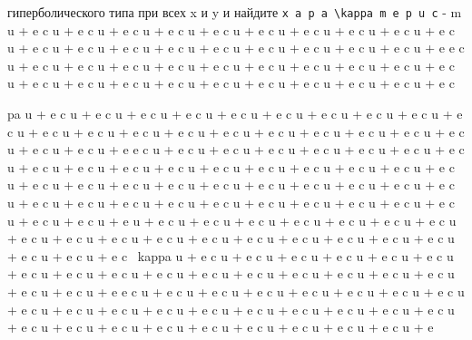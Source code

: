 \documentclass[
  ukrainian,
]{article}
\begin{document}
гиперболического типа при всех x и y и найдите
\texttt{x\ a\ p\ a\ \textbackslash{}kappa\ m\ e\ p\ u\ c} - m u + e c
\kappa u + e c \kappa u + e c \kappa u + e c \kappa u + e c \kappa u + e
c \kappa u + e c \kappa u + e c \kappa u + e c \kappa u + e c \kappa u +
e c \kappa u + e c \kappa u + e c \kappa u + e c \kappa u + e c \kappa u
+ e c \kappa u + e c \kappa u + e c \kappa u + e c \kappa u + e e c
\kappa u + e c \kappa u + e c \kappa u + e c \kappa u + e c \kappa u + e
c \kappa u + e c \kappa u + e c \kappa u + e c \kappa u + e c \kappa u +
e c \kappa u + e c \kappa u + e c \kappa u + e c \kappa u + e c \kappa u
+ e c \kappa u + e c \kappa u + e c \kappa u + e c \kappa u + e c \kap u
+ e c \kap

pa u + e c \kappa u + e c \kappa u + e c \kappa u + e c \kappa u + e c
\kappa u + e c \kappa u + e c \kappa u + e c \kappa u + e c \kappa u + e
c \kappa u + e c \kappa u + e c \kappa u + e c \kappa u + e c \kappa u +
e c \kappa u + e c \kappa u + e c \kappa u + e c \kappa u + e c \kappa u
+ e c \kappa u + e c \kappa u + e c \kappa u + e e c \kappa u + e c
\kappa u + e c \kappa u + e c \kappa u + e c \kappa u + e c \kappa u + e
c \kappa u + e c \kappa u + e c \kappa u + e c \kappa u + e c \kappa u +
e c \kappa u + e c \kappa u + e c \kappa u + e c \kappa u + e c \kappa u
+ e c \kappa u + e c \kappa u + e c \kappa u + e c \kappa u + e c
\kappa u + e c \kappa u + e c \kappa u + e c \kappa u + e c \kappa u + e
c \kappa u + e c \kappa u + e c \kappa u + e c \kappa u + e c \kappa u +
e c \kappa u + e c \kappa u + e c \kappa u + e c \kappa u + e c \kappa u
+ e c \kappa u + e c \kappa u + e c \kappa u + e c \kappa u + e c
\kappa u + e u + e c \kappa u + e c \kappa u + e c \kappa u + e c
\kappa u + e c \kappa u + e c \kappa u + e c \kappa u + e c \kappa u + e
c \kappa u + e c \kappa u + e c \kappa u + e c \kappa u + e c \kappa u +
e c \kappa u + e c \kappa u + e c \kappa u + e c \kappa u + e c \kappa u
+ e c \kappa u + e c ~kappa u + e c \kappa u + e c \kappa u + e c
\kappa u + e c \kappa u + e c \kappa u + e c \kappa u + e c \kappa u + e
c \kappa u + e c \kappa u + e c \kappa u + e c \kappa u + e c \kappa u +
e c \kappa u + e c \kappa u + e c \kappa u + e c \kappa u + e c \kappa u
+ e c \kappa u + e e c \kappa u + e c \kappa u + e c \kappa u + e c
\kappa u + e c \kappa u + e c \kappa u + e c \kappa u + e c \kappa u + e
c \kappa u + e c \kappa u + e c \kappa u + e c \kappa u + e c \kappa u +
e c \kappa u + e c \kappa u + e c \kappa u + e c \kappa u + e c \kappa u
+ e c \kappa u + e c \kappa u + e c \kappa u + e c \kappa u + e c
\kappa u + e c \kappa u + e c \kappa u + e c \kappa u + e c \kappa u + e
\end{document}
